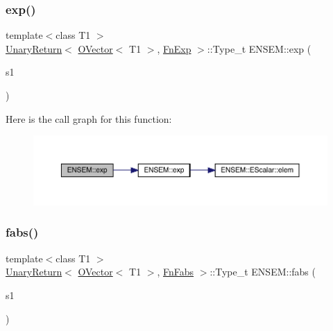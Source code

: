 \mbox{\label{group__obsvector_gaff567614c6353e7b44ea426239a64baf}} 
\subsubsection{\texorpdfstring{exp()}{exp()}}
{\footnotesize\ttfamily template$<$class T1 $>$ \\
\mbox{\hyperlink{structENSEM_1_1UnaryReturn}{Unary\+Return}}$<$ \mbox{\hyperlink{classENSEM_1_1OVector}{O\+Vector}}$<$ T1 $>$, \mbox{\hyperlink{structENSEM_1_1FnExp}{Fn\+Exp}} $>$\+::Type\+\_\+t E\+N\+S\+E\+M\+::exp (\begin{DoxyParamCaption}\item[{const \mbox{\hyperlink{classENSEM_1_1OVector}{O\+Vector}}$<$ T1 $>$ \&}]{s1 }\end{DoxyParamCaption})\hspace{0.3cm}{\ttfamily [inline]}}

Here is the call graph for this function\+:\nopagebreak
\begin{figure}[H]
\begin{center}
\leavevmode
\includegraphics[width=350pt]{da/d59/group__obsvector_gaff567614c6353e7b44ea426239a64baf_cgraph}
\end{center}
\end{figure}
\mbox{\label{group__obsvector_ga0c007ded942b0d671e46d502b7de7294}} 
\subsubsection{\texorpdfstring{fabs()}{fabs()}}
{\footnotesize\ttfamily template$<$class T1 $>$ \\
\mbox{\hyperlink{structENSEM_1_1UnaryReturn}{Unary\+Return}}$<$ \mbox{\hyperlink{classENSEM_1_1OVector}{O\+Vector}}$<$ T1 $>$, \mbox{\hyperlink{structENSEM_1_1FnFabs}{Fn\+Fabs}} $>$\+::Type\+\_\+t E\+N\+S\+E\+M\+::fabs (\begin{DoxyParamCaption}\item[{const \mbox{\hyperlink{classENSEM_1_1OVector}{O\+Vector}}$<$ T1 $>$ \&}]{s1 }\end{DoxyParamCaption})\hspace{0.3cm}{\ttfamily [inline]}}


